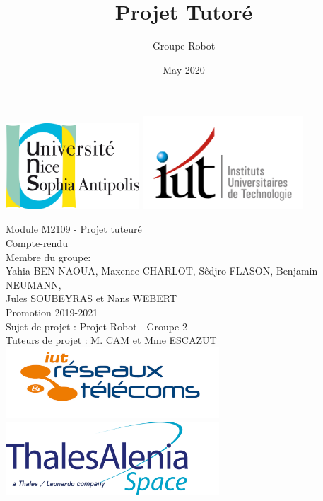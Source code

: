 \documentclass{PackagerQualityN}
\title{Projet Tutoré}
\author{Groupe Robot}
\date{May 2020}
\begin{document}
\begin{titlepage}%


\includegraphics[width=5cm]{./img/logoUniv.png}
\hfill
\includegraphics[width=6cm]{./img/logoIUT.jpg}


\begin{center}
\Huge
Module M2109 - Projet tuteuré\\
Compte-rendu
\\
\vspace{1cm}
\vspace{1cm}
\large
Membre du groupe:\\
Yahia BEN NAOUA, Maxence CHARLOT, Sêdjro FLASON, Benjamin NEUMANN,\\ Jules SOUBEYRAS et Nans WEBERT\\
Promotion 2019-2021\\
\vspace{2.2cm}
Sujet de projet : Projet Robot - Groupe 2\\
Tuteurs de projet : M. CAM et Mme ESCAZUT\\
\vspace{1cm}
\includegraphics[width=8cm]{img/logoRetT.png}
\hfill
\includegraphics[width=8cm]{img/logoThales.png}

\end{center}


\end{titlepage}
\end{document}
